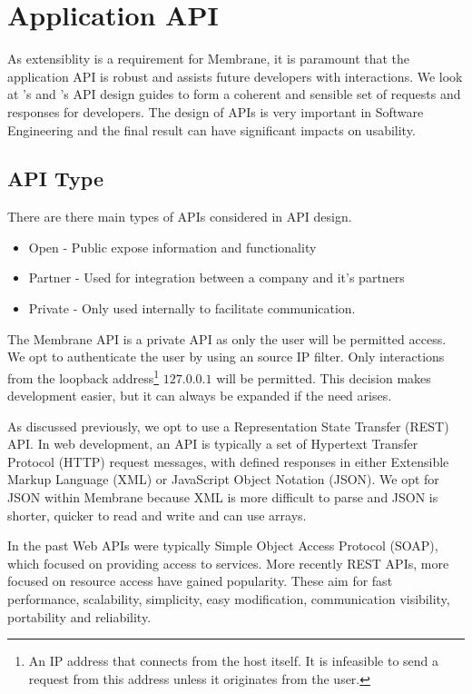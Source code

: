 \documentclass[11pt, a4paper, twocolumn, twoside]{report}
\begin{document}
\section{Application API}

As extensiblity is a requirement for Membrane, it is paramount that the application API is robust and assists future developers with interactions. We look at \cite{google2017api}'s and \cite{heroku2017api}'s API design guides to form a coherent and sensible set of requests and responses for developers. The design of APIs is very important in Software Engineering and the final result can have significant impacts on usability. \citep{benslimane2008services} 

\subsection{API Type}

There are there main types of APIs considered in API design. \citep{boyd2017api}

\begin{itemize}
 \item Open - Public expose information and functionality
 \item Partner - Used for integration between a company and it's partners
 \item Private - Only used internally to facilitate communication.
\end{itemize}

The Membrane API is a private API as only the user will be permitted access. We opt to authenticate the user by using an source IP filter. Only interactions from the loopback address\footnote{An IP address that connects from the host itself. \citep{hinden2006ip} It is infeasible to send a request from this address unless it originates from the user.} $127.0.0.1$ will be permitted. This decision makes development easier, but it can always be expanded if the need arises.

As discussed previously, we opt to use a Representation State Transfer (REST) API. In web development, an API is typically a set of Hypertext Transfer Protocol (HTTP) request messages, with defined responses in either Extensible Markup Language (XML) or JavaScript Object Notation (JSON). We opt for JSON within Membrane because XML is more difficult to parse and JSON is shorter, quicker to read and write and can use arrays.

In the past Web APIs were typically Simple Object Access Protocol (SOAP), which focused on providing access to services. \citep{benslimane2008services} More recently REST APIs, more focused on resource access have gained popularity. These aim for fast performance, scalability, simplicity, easy modification, communication visibility, portability and reliability. \citep{fielding2000architectural}
\end{document}
